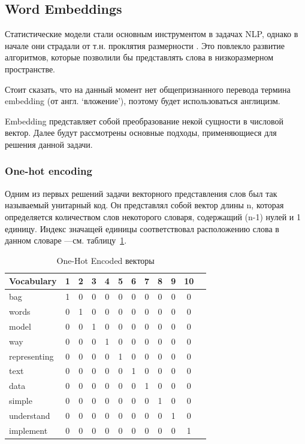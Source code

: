 \subsection{Word Embeddings}

Статистические модели стали основным инструментом в задачах NLP, однако в начале они страдали от т.н. проклятия размерности \autocite{bellman1957dynamic}. Это повлекло развитие алгоритмов, которые позволили бы представлять слова в низкоразмерном пространстве.

Стоит сказать, что на данный момент нет общепризнанного перевода термина embedding (от англ. ‘вложение’), поэтому будет использоваться англицизм. 

Embedding представляет собой преобразование некой сущности в числовой вектор. Далее будут рассмотрены основные подходы, применяющиеся для решения данной задачи.

\subsubsection{One-hot encoding}

Одним из первых решений задачи векторного представления слов был так называемый унитарный код. Он представлял собой вектор длины n, которая определяется количеством слов некоторого словаря, содержащий (n-1) нулей и 1 единицу. Индекс значащей единицы соответствовал расположению слова в данном словаре ---см. таблицу~\ref{tab:bow-ohe}.

\begin{table}
\centering
\caption{\label{tab:bow-ohe}One-Hot Encoded векторы}
\begin{tabular}{@{}lccccccccccc@{}}
\toprule
Vocabulary   & 1 & 2 & 3 & 4 & 5 & 6 & 7 & 8 & 9 & 10 \\ \midrule
bag          & 1 & 0 & 0 & 0 & 0 & 0 & 0 & 0 & 0 & 0  \\
words        & 0 & 1 & 0 & 0 & 0 & 0 & 0 & 0 & 0 & 0  \\
model        & 0 & 0 & 1 & 0 & 0 & 0 & 0 & 0 & 0 & 0  \\
way          & 0 & 0 & 0 & 1 & 0 & 0 & 0 & 0 & 0 & 0  \\
representing & 0 & 0 & 0 & 0 & 1 & 0 & 0 & 0 & 0 & 0  \\
text         & 0 & 0 & 0 & 0 & 0 & 1 & 0 & 0 & 0 & 0  \\
data         & 0 & 0 & 0 & 0 & 0 & 0 & 1 & 0 & 0 & 0  \\
simple       & 0 & 0 & 0 & 0 & 0 & 0 & 0 & 1 & 0 & 0  \\
understand   & 0 & 0 & 0 & 0 & 0 & 0 & 0 & 0 & 1 & 0  \\
implement    & 0 & 0 & 0 & 0 & 0 & 0 & 0 & 0 & 0 & 1  \\ \bottomrule
\end{tabular}
\end{table}

